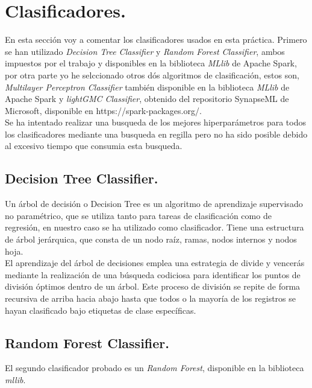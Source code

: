 \documentclass[11pt]{article}
\begin{document}
\section{Clasificadores.}

En esta sección voy a comentar los clasificadores usados en esta práctica. Primero se han utilizado \textit{Decision Tree Classifier} y \textit{Random Forest Classifier}, ambos impuestos por el trabajo y disponibles en la biblioteca \textit{MLlib} de Apache Spark, por otra parte yo he selccionado otros dós algoritmos de clasificación, estos son, \textit{Multilayer Perceptron Classifier} también disponible en la biblioteca \textit{MLlib} de Apache Spark y \textit{lightGMC Classifier}, obtenido del repositorio SynapseML de Microsoft, disponible en  https://spark-packages.org/.\\

Se ha intentado realizar una busqueda de los mejores hiperparámetros para todos los clasificadores mediante una busqueda en regilla pero no ha sido posible debido al excesivo tiempo que consumia esta busqueda.

\subsection{Decision Tree Classifier.}

Un árbol de decisión o Decision Tree es un algoritmo de aprendizaje supervisado no paramétrico, que se utiliza tanto para tareas de clasificación como de regresión, en nuestro caso se ha utilizado como clasificador. Tiene una estructura de árbol jerárquica, que consta de un nodo raíz, ramas, nodos internos y nodos hoja.\\

El aprendizaje del árbol de decisiones emplea una estrategia de divide y vencerás mediante la realización de una búsqueda codiciosa para identificar los puntos de división óptimos dentro de un árbol. Este proceso de división se repite de forma recursiva de arriba hacia abajo hasta que todos o la mayoría de los registros se hayan clasificado bajo etiquetas de clase específicas.

\subsection{Random Forest Classifier.}

El segundo clasificador probado es un \textit{Random Forest}, disponible en la biblioteca \textit{mllib}.\\
\end{document}
